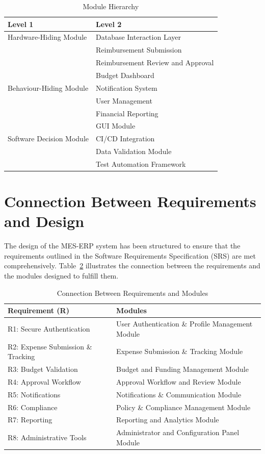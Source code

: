 \documentclass[12pt, titlepage]{article}
\begin{document}
\begin{table}[H]
\centering
\renewcommand{\arraystretch}{1.5}
\begin{tabular}{p{} p{}}
\toprule
\textbf{Level 1} & \textbf{Level 2}\\
\midrule
Hardware-Hiding Module & Database Interaction Layer \\ 
\midrule
\multirow{7}{0.3\textwidth}{Behaviour-Hiding Module} 
& Reimbursement Submission \\
& Reimbursement Review and Approval \\
& Budget Dashboard \\
& Notification System \\
& User Management \\
& Financial Reporting \\
& GUI Module \\
\midrule
Software Decision Module & CI/CD Integration \\
& Data Validation Module \\
& Test Automation Framework \\
\bottomrule
\end{tabular}
\caption{Module Hierarchy}
\label{TblMH}
\end{table}


\section{Connection Between Requirements and Design}

The design of the MES-ERP system has been structured to ensure that the requirements outlined in the Software Requirements Specification (SRS) are met comprehensively. Table~\ref{tab:req-to-modules} illustrates the connection between the requirements and the modules designed to fulfill them.

\begin{table}[h!]
\centering
\caption{Connection Between Requirements and Modules}
\label{tab:req-to-modules}
\begin{tabular}{|p{4cm}|p{8cm}|}
\hline
\textbf{Requirement (R)} & \textbf{Modules} \\
\hline
R1: Secure Authentication & User Authentication \& Profile Management Module \\
\hline
R2: Expense Submission \& Tracking & Expense Submission \& Tracking Module \\
\hline
R3: Budget Validation & Budget and Funding Management Module \\
\hline
R4: Approval Workflow & Approval Workflow and Review Module \\
\hline
R5: Notifications & Notifications \& Communication Module \\
\hline
R6: Compliance & Policy \& Compliance Management Module \\
\hline
R7: Reporting & Reporting and Analytics Module \\
\hline
R8: Administrative Tools & Administrator and Configuration Panel Module \\
\hline
\end{tabular}
\end{table}
\end{document}
